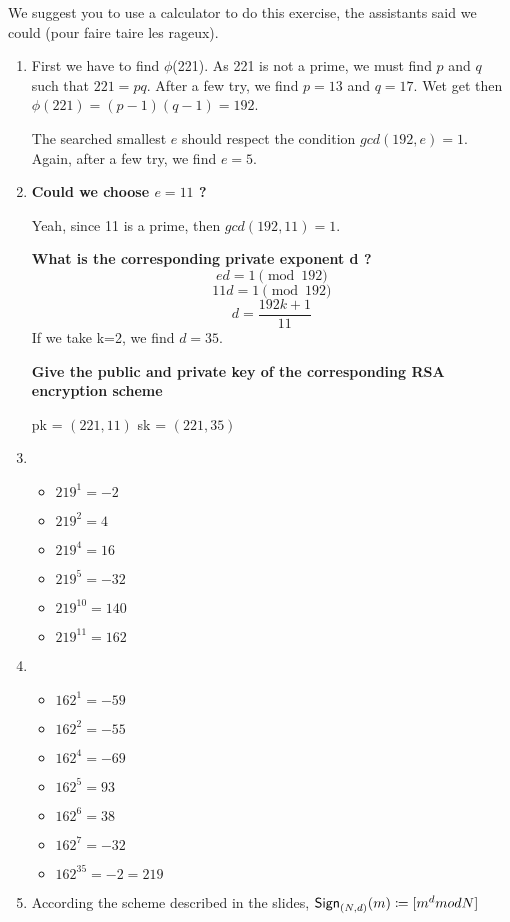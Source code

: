 \begin{solution}
	We suggest you to use a calculator to do this exercise, the assistants said we could (pour faire taire les rageux).
	\begin{enumerate}
		\item

		First we have to find $\phi$(221). As 221 is not a prime, we must find $p$ and $q$ such that $221 = pq$. After a few try, we find $p = 13$ and $q = 17$. Wet get then $\phi(221) = (p-1)(q-1) = 192$.

		The searched smallest $e$ should respect the condition $gcd(192, e) = 1$. Again, after a few try, we find $e = 5$.
		\item \textbf{Could we choose $e = 11$ ?}

		Yeah, since 11 is a prime, then $gcd(192, 11) = 1$.

		\textbf{What is the corresponding private exponent d ?}
		\[ ed = 1 \pmod{192}\] \[11d = 1 \pmod 192\] \[d = \frac{192k + 1}{11}\]
		If we take k=2, we find $d = 35$.

		\textbf{Give the public and private key of the corresponding RSA encryption scheme}

		pk = $(221, 11)$
		sk = $(221, 35)$
		\item
		\begin{itemize}
			\item $219^{1} = -2 $
			\item $219^{2} = 4  $
			\item $219^{4} = 16 $
			\item $219^{5} = -32$
			\item $219^{10} = 140$
			\item $219^{11} = 162$
		\end{itemize}
		\item
		\begin{itemize}
			\item $162^{1} = -59 $
			\item $162^{2} = -55 $
			\item $162^{4} = -69 $
			\item $162^{5} = 93 $
			\item $162^{6} = 38 $
			\item $162^{7} = -32 $
			\item $162^{35} = -2 = 219 $
		\end{itemize}
		\item

		According the scheme described in the slides, $\operatorname{\mathsf{Sign}}_{(N, d)}(m) \coloneqq [m^d mod N]$


\end{enumerate}
\end{solution}
